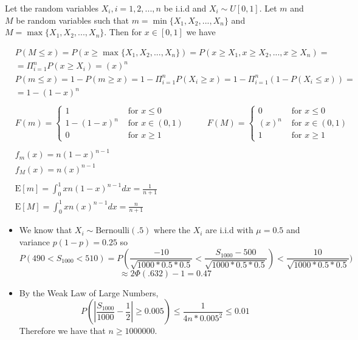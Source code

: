 \documentclass[12pt]{article}
\newcommand{\E}{\mathrm{E}}
\newenvironment{problem}[2][Problem]{\begin{trivlist}
\item[\hskip \labelsep {\bfseries #1}\hskip \labelsep {\bfseries #2}]}{\end{trivlist}}
\begin{document}
\begin{problem}{8.} Let the random variables $X_i, i=1,2,...,n$ be i.i.d and $X_i \sim U[0,1]$. Let $m$ and $M$ be random variables such that $m = \min \{X_1, X_2,...,X_n\}$ and $M = \max \{X_1, X_2,...,X_n\}$. Then for $x \in [0,1]$ we have

\begin{equation*}
\begin{aligned}
& P(M \leq x) =P(x \geq \max \{X_1, X_2,...,X_n\}) = P(x \geq X_1, x \geq X_2,..., x \geq X_n) =\\
&= \Pi_{i=1}^n P(x \geq X_i) = (x)^n\\
&P(m \leq x) = 1- P(m \geq x) = 1-\Pi_{i=1}^n P(X_i \geq x) =1-\Pi_{i=1}^n (1- P(X_i \leq x))= \\
&= 1-(1-x)^n\\\\
& F(m)=\begin{cases}
               1  &\text{ for } x \leq 0 \\
               1- (1-x)^{n}&\text{ for } x \in (0,1) \\
               0 &\text{ for } x \geq 1
            \end{cases}
\hspace{1cm}
 F(M)=\begin{cases}
               0  &\text{ for } x \leq 0 \\
               (x)^{n} &\text{ for } x \in (0,1) \\
               1 &\text{ for } x \geq 1
            \end{cases}\\\\
&f_m(x) = n(1-x)^{n-1}\\
&f_M(x) = n(x)^{n-1}\\\\
&\E[m] = \int_0^1 xn(1-x)^{n-1} dx = \frac{1}{n+1}\\
&\E[M] = \int_0^1 xn(x)^{n-1} dx = \frac{n}{n+1}
\end{aligned}
\end{equation*}

\end{problem}

\begin{problem}{9.} \hfill
\begin{itemize}
\item[(a)] We know that $X_i \sim \text{Bernoulli}(.5)$ where the $X_i$ are i.i.d with $\mu = 0.5$ and variance $p(1-p) = 0.25$ so 
$$P( 490 < S_1000 < 510) = P(\frac{-10}{\sqrt{1000*0.5*0.5}} < \frac{S_1000 - 500}{\sqrt{1000*0.5*0.5}}) < \frac{10}{\sqrt{1000*0.5*0.5}})$$
$$ \approx 2\Phi(.632)-1 = 0.47$$
\item[(b)] By the Weak Law of Large Numbers, $$P(|\frac{S_{1000}}{1000} - \frac{1}{2}| \geq 0.005) \leq \frac{1}{4n*0.005^2} \leq 0.01$$
Therefore we have that $n \geq 1000000$. 

\end{itemize}
\end{problem}
\end{document}
